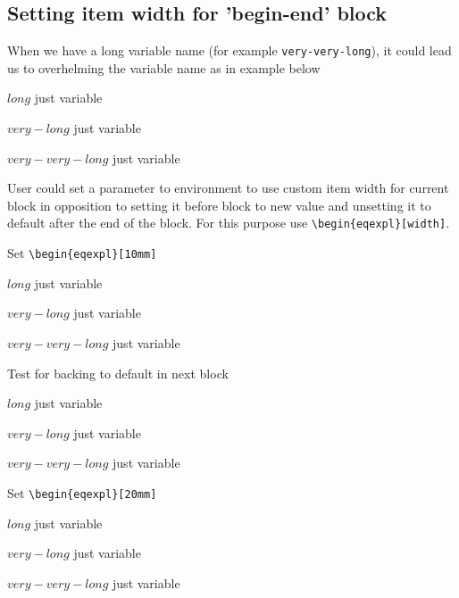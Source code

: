 \documentclass{article}
\begin{document}
\eqexplSetItemWidth{5mm}

\subsection{Setting item width for 'begin-end' block}

When we have a long variable name (for example \verb+very-very-long+),
it could lead us to overhelming the variable name as in example below

\begin{eqexpl}
  \item{$long$} just variable
  \item{$very-long$} just variable
  \item{$very-very-long$} just variable
\end{eqexpl}

User could set a parameter to environment to use custom item width for
current block in opposition to setting it before block to new value
and unsetting it to default after the end of the block.  For this
purpose use \verb+\begin{eqexpl}[width]+.

\noindent Set \verb+\begin{eqexpl}[10mm]+

\begin{eqexpl}[10mm]
  \item{$long$} just variable
  \item{$very-long$} just variable
  \item{$very-very-long$} just variable
\end{eqexpl}

\vspace{5mm}

\noindent Test for backing to default in next block

\begin{eqexpl}
  \item{$long$} just variable
  \item{$very-long$} just variable
  \item{$very-very-long$} just variable
\end{eqexpl}

\vspace{5mm}

\noindent Set \verb+\begin{eqexpl}[20mm]+

\begin{eqexpl}[20mm]
  \item{$long$} just variable
  \item{$very-long$} just variable
  \item{$very-very-long$} just variable
\end{eqexpl}
\end{document}
